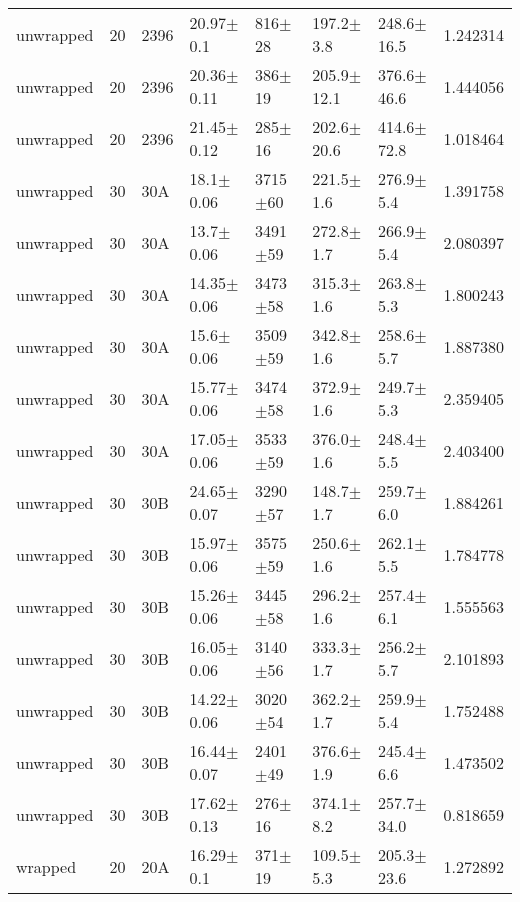 \begin{tabular}{lrlllllr}
    unwrapped &      20 &    2396 &    20.97$\pm$0.1 &   816$\pm$28 &   197.2$\pm$3.8 &  248.6$\pm$16.5 &    1.242314 \\
    unwrapped &      20 &    2396 &   20.36$\pm$0.11 &   386$\pm$19 &  205.9$\pm$12.1 &  376.6$\pm$46.6 &    1.444056 \\
    unwrapped &      20 &    2396 &   21.45$\pm$0.12 &   285$\pm$16 &  202.6$\pm$20.6 &  414.6$\pm$72.8 &    1.018464 \\
    unwrapped &      30 &     30A &    18.1$\pm$0.06 &  3715$\pm$60 &   221.5$\pm$1.6 &   276.9$\pm$5.4 &    1.391758 \\
    unwrapped &      30 &     30A &    13.7$\pm$0.06 &  3491$\pm$59 &   272.8$\pm$1.7 &   266.9$\pm$5.4 &    2.080397 \\
    unwrapped &      30 &     30A &   14.35$\pm$0.06 &  3473$\pm$58 &   315.3$\pm$1.6 &   263.8$\pm$5.3 &    1.800243 \\
    unwrapped &      30 &     30A &    15.6$\pm$0.06 &  3509$\pm$59 &   342.8$\pm$1.6 &   258.6$\pm$5.7 &    1.887380 \\
    unwrapped &      30 &     30A &   15.77$\pm$0.06 &  3474$\pm$58 &   372.9$\pm$1.6 &   249.7$\pm$5.3 &    2.359405 \\
    unwrapped &      30 &     30A &   17.05$\pm$0.06 &  3533$\pm$59 &   376.0$\pm$1.6 &   248.4$\pm$5.5 &    2.403400 \\
    unwrapped &      30 &     30B &   24.65$\pm$0.07 &  3290$\pm$57 &   148.7$\pm$1.7 &   259.7$\pm$6.0 &    1.884261 \\
    unwrapped &      30 &     30B &   15.97$\pm$0.06 &  3575$\pm$59 &   250.6$\pm$1.6 &   262.1$\pm$5.5 &    1.784778 \\
    unwrapped &      30 &     30B &   15.26$\pm$0.06 &  3445$\pm$58 &   296.2$\pm$1.6 &   257.4$\pm$6.1 &    1.555563 \\
    unwrapped &      30 &     30B &   16.05$\pm$0.06 &  3140$\pm$56 &   333.3$\pm$1.7 &   256.2$\pm$5.7 &    2.101893 \\
    unwrapped &      30 &     30B &   14.22$\pm$0.06 &  3020$\pm$54 &   362.2$\pm$1.7 &   259.9$\pm$5.4 &    1.752488 \\
    unwrapped &      30 &     30B &   16.44$\pm$0.07 &  2401$\pm$49 &   376.6$\pm$1.9 &   245.4$\pm$6.6 &    1.473502 \\
    unwrapped &      30 &     30B &   17.62$\pm$0.13 &   276$\pm$16 &   374.1$\pm$8.2 &  257.7$\pm$34.0 &    0.818659 \\
      wrapped &      20 &     20A &    16.29$\pm$0.1 &   371$\pm$19 &   109.5$\pm$5.3 &  205.3$\pm$23.6 &    1.272892 \\

\end{tabular}
